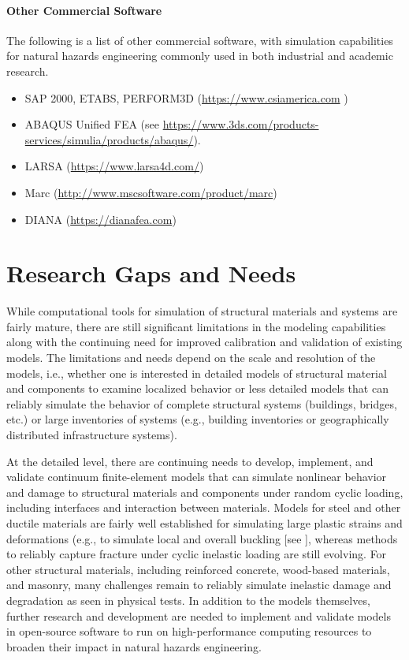 \paragraph{Other Commercial Software} The following is a list of other commercial software, with simulation capabilities for natural hazards engineering commonly used in both industrial and academic research.

\begin{itemize}
    \item SAP 2000, ETABS, PERFORM3D (\url{https://www.csiamerica.com} )
    \item ABAQUS Unified FEA (see \url{https://www.3ds.com/products-services/simulia/products/abaqus/}).
    \item LARSA (\url{https://www.larsa4d.com/})
    \item Marc (\url{http://www.mscsoftware.com/product/marc})
    \item DIANA (\url{https://dianafea.com})
\end{itemize}

\section{Research Gaps and Needs}
\label{sec:resp_struct_gaps}

While computational tools for simulation of structural materials and systems are fairly mature, there are still significant limitations in the modeling capabilities along with the continuing need for improved calibration and validation of existing models. The limitations and needs depend on the scale and resolution of the models, i.e., whether one is interested in detailed models of structural material and components to examine localized behavior or less detailed models that can reliably simulate the behavior of complete structural systems (buildings, bridges, etc.) or large inventories of systems (e.g., building inventories or geographically distributed infrastructure systems). 

At the detailed level, there are continuing needs to develop, implement, and validate continuum finite-element models that can simulate nonlinear behavior and damage to structural materials and components under random cyclic loading, including interfaces and interaction between materials. Models for steel and other ductile materials are fairly well established for simulating large plastic strains and deformations (e.g., to simulate local and overall buckling [see \cite{n.i.s.t.-a.t.c.2018blind}], whereas methods to reliably capture fracture under cyclic inelastic loading are still evolving. For other structural materials, including reinforced concrete, wood-based materials, and masonry, many challenges remain to reliably simulate inelastic damage and degradation as seen in physical tests. In addition to the models themselves, further research and development are needed to implement and validate models in open-source software to run on high-performance computing resources to broaden their impact in natural hazards engineering.

